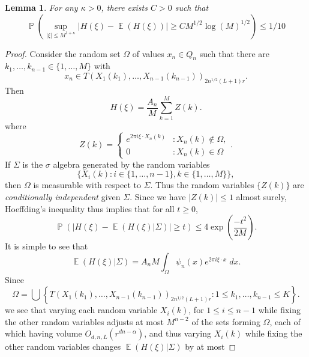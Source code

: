\documentclass[dvipsnames,letterpaper,12pt]{article}
\numberwithin{equation}{section}
\newtheorem{lemma}[theorem]{Lemma}
\numberwithin{theorem}{section}
\DeclareMathOperator{\EE}{\mathbb{E}}
\DeclareMathOperator{\PP}{\mathbb{P}}
\begin{document}
\begin{lemma} \label{lastconcentrationbound}
    For any $\kappa > 0$, there exists $C > 0$ such that
    \[ \PP \left( \sup_{|\xi| \leq M^{1 + \kappa}} | H(\xi) - \EE(H(\xi)) | \geq C M^{1/2} \log(M)^{1/2} \right) \leq 1/10 \]
\end{lemma}
\begin{proof}
    Consider the random set $\Omega$ of values $x_n \in Q_n$ such that there are $k_1,\dots,k_{n-1} \in \{ 1,\dots,M \}$ with
    \begin{equation}
        x_n \in T(X_1(k_1),\dots,X_{n-1}(k_{n-1}))_{2 n^{1/2} (L+1) r}.
    \end{equation}
    Then
    \begin{equation}
        H(\xi) = \frac{A_n}{M} \sum_{k = 1}^M Z(k).
    \end{equation}
    where
    \[ Z(k) = \begin{cases} e^{2 \pi i \xi \cdot X_n(k)} &: X_n(k) \not \in \Omega, \\ 0 &: X_n(k) \in \Omega \end{cases}. \]
    If $\Sigma$ is the $\sigma$ algebra generated by the random variables
    \[ \{ X_i(k) : i \in \{ 1, \dots, n-1 \}, k \in \{ 1, \dots, M \} \}, \]
    then $\Omega$ is measurable with respect to $\Sigma$. Thus the random variables $\{ Z(k) \}$ are \emph{conditionally independent} given $\Sigma$. Since we have $|Z(k)| \leq 1$ almost surely, Hoeffding's inequality thus implies that for all $t \geq 0$,
    \begin{equation} \label{equationCOIJCOIJX1232312ssss}
        \PP \left( \left| H(\xi) - \EE(H(\xi)|\Sigma) \right| \geq t \right) \leq 4 \exp \left( \frac{-t^2}{2M} \right).
    \end{equation}
    It is simple to see that
    \begin{equation}
        \EE(H(\xi) | \Sigma) = A_n M \int_\Omega \psi_n(x) e^{2 \pi i \xi \cdot x}\; dx.
    \end{equation}
    Since
    \begin{equation}
        \Omega = \bigcup \left\{ T(X_1(k_1),\dots,X_{n-1}(k_{n-1}))_{2 n^{1/2} (L+1) r} : 1 \leq k_1,\dots,k_{n-1} \leq K \right\}.
    \end{equation}
    we see that varying each random variable $X_i(k)$, for $1 \leq i \leq n-1$ while fixing the other random variables adjusts at most $M^{n-2}$ of the sets forming $\Omega$, each of which having volume $O_{d,n,L}(r^{dn - \alpha})$, and thus varying $X_i(k)$ while fixing the other random variables changes $\EE(H(\xi)|\Sigma)$ by at most

\end{proof}
\end{document}
